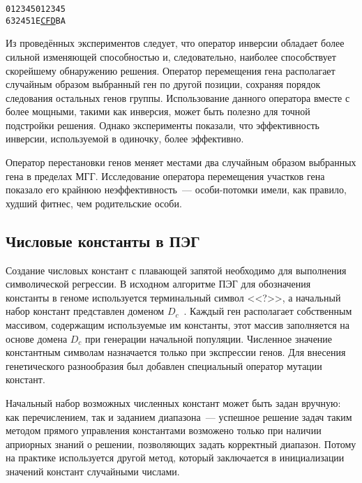 \begin{samepage}
\begin{alltt}
012345 012345
632451 E{\underline{CFD}}BA
\end{alltt}
\end{samepage}

Из проведённых экспериментов следует, что оператор инверсии обладает более сильной изменяющей способностью и, следовательно, наиболее способствует скорейшему обнаружению решения.
Оператор перемещения гена располагает случайным образом выбранный ген по другой позиции, сохраняя порядок следования остальных генов группы. Использование данного оператора вместе с более мощными, такими как инверсия, может быть полезно для точной подстройки решения. Однако эксперименты показали, что эффективность инверсии, используемой в одиночку, более эффективно.

Оператор перестановки генов меняет местами два случайным образом выбранных гена в пределах МГГ. Исследование оператора перемещения участков гена показало его крайнюю неэффективность~--- особи-потомки имели, как правило, худший фитнес, чем родительские особи.


\subsection{Числовые константы в ПЭГ}

Создание числовых констант с плавающей запятой необходимо для выполнения символической регрессии. В исходном алгоритме ПЭГ для обозначения константы в геноме используется терминальный символ <<?>>, а начальный набор констант представлен доменом $D_c$~\cite{ferreira:2002:WSC}. Каждый ген располагает собственным массивом, содержащим используемые им константы, этот массив заполняется на основе домена $D_c$ при генерации начальной популяции. Численное значение константным символам назначается только при экспрессии генов. Для внесения генетического разнообразия был добавлен специальный оператор мутации констант.

Начальный набор возможных численных констант может быть задан вручную: как перечислением, так и заданием диапазона~--- успешное решение задач таким методом прямого управления константами возможено только при наличии априорных знаний о решении, позволяющих задать корректный диапазон. Потому на практике используется другой метод, который заключается в инициализации значений констант случайными числами.

